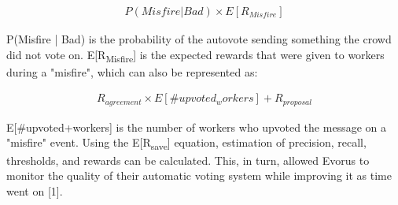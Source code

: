 \documentclass[letterpaper, 10 pt, conference]{IEEEtran}
\begin{document}
\begin{equation}
\begin{gathered}
P(Misfire|Bad) \times E[R_{Misfire}]
\end{gathered}
\end{equation}

P(Misfire | Bad) is the probability of the autovote sending something the crowd did not vote on. E[R\textsubscript{Misfire}] is the expected rewards that were given to workers during a "misfire", which can also be represented as:

\begin{equation}
\begin{gathered}
R_{agreement} \times E[\#upvoted_workers] + R_{proposal}
\end{gathered}
\end{equation}

E[\#upvoted+workers] is the number of workers who upvoted the message on a "misfire" event. Using the E[R\textsubscript{save}] equation, estimation of precision, recall, thresholds, and rewards can be calculated. This, in turn, allowed Evorus to monitor the quality of their automatic voting system while improving it as time went on [1].
\end{document}
